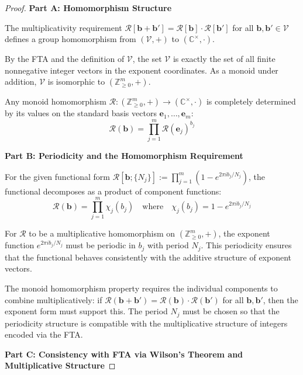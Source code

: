 \begin{proof}

\noindent \textbf{Part A: Homomorphism Structure}

The multiplicativity requirement $\mathcal{R}[\mathbf{b} + \mathbf{b}'] = \mathcal{R}[\mathbf{b}] \cdot \mathcal{R}[\mathbf{b}']$ for all $\mathbf{b}, \mathbf{b}' \in \mathcal{V}$ defines a group homomorphism from $(\mathcal{V}, +)$ to $(\mathbb{C}^\times, \cdot)$.

By the FTA and the definition of $\mathcal{V}$, the set $\mathcal{V}$ is exactly the set of all finite nonnegative integer vectors in the exponent coordinates. As a monoid under addition, $\mathcal{V}$ is isomorphic to $(\mathbb{Z}_{\geq 0}^m, +)$.

Any monoid homomorphism $\mathcal{R}: (\mathbb{Z}_{\geq 0}^m, +) \to (\mathbb{C}^\times, \cdot)$ is completely determined by its values on the standard basis vectors $\mathbf{e}_1, \ldots, \mathbf{e}_m$:
\begin{equation}
\mathcal{R}(\mathbf{b}) = \prod_{j=1}^m \mathcal{R}(\mathbf{e}_j)^{b_j}
\end{equation}

\noindent \textbf{Part B: Periodicity and the Homomorphism Requirement}

For the given functional form $\mathcal{R}[\mathbf{b}; \{N_j\}] := \prod_{j=1}^m (1 - e^{2\pi i b_j / N_j})$, the functional decomposes as a product of component functions:
\begin{equation}
\mathcal{R}(\mathbf{b}) = \prod_{j=1}^m \chi_j(b_j) \quad \text{where} \quad \chi_j(b_j) = 1 - e^{2\pi i b_j / N_j}
\end{equation}

For $\mathcal{R}$ to be a multiplicative homomorphism on $(\mathbb{Z}_{\geq 0}^m, +)$, the exponent function $e^{2\pi i b_j / N_j}$ must be periodic in $b_j$ with period $N_j$. This periodicity ensures that the functional behaves consistently with the additive structure of exponent vectors.

The monoid homomorphism property requires the individual components to combine multiplicatively: if $\mathcal{R}(\mathbf{b} + \mathbf{b}') = \mathcal{R}(\mathbf{b}) \cdot \mathcal{R}(\mathbf{b}')$ for all $\mathbf{b}, \mathbf{b}'$, then the exponent form must support this. The period $N_j$ must be chosen so that the periodicity structure is compatible with the multiplicative structure of integers encoded via the FTA.

\noindent \textbf{Part C: Consistency with FTA via Wilson's Theorem and Multiplicative Structure}


\end{proof}
